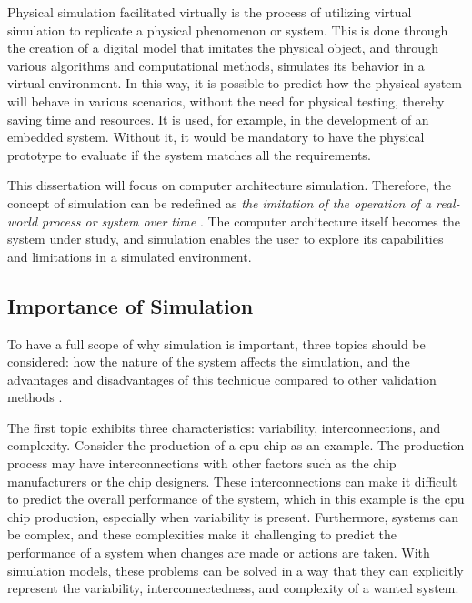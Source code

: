 Physical simulation facilitated virtually is the process of utilizing virtual simulation to replicate a physical phenomenon or system. This 
is done through the creation of a digital model that imitates the physical object, and through various algorithms and computational methods, 
simulates its behavior in a virtual environment. In this way, it is possible to predict how the physical system will behave in various scenarios, 
without the need for physical testing, thereby saving time and resources. It is used, for example, in the development of an embedded system. 
Without it, it would be mandatory to have the physical prototype to evaluate if the system matches all the requirements. 

This dissertation will focus on computer architecture simulation. Therefore, the concept of simulation can be redefined as \emph{the imitation 
of the operation of a real-world process or system over time} \cite{banks1999introduction}. The computer architecture itself becomes the system 
under study, and simulation enables the user to explore its capabilities and limitations in a simulated environment.

\subsection{Importance of Simulation}

To have a full scope of why simulation is important, three topics should be considered: how the nature of the system affects the simulation, and 
the advantages and disadvantages of this technique compared to other validation methods \cite{SimulationBook}.

The first topic exhibits three characteristics: variability, interconnections, and complexity. Consider the production of a \gls{cpu} chip as an 
example. The production process may have interconnections with other factors such as the chip manufacturers or the chip designers. These 
interconnections can make it difficult to predict the overall performance of the system, which in this example is the \gls{cpu} chip production, 
especially when variability is present. Furthermore, systems can be complex, and these complexities make it challenging to predict the performance 
of a system when changes are made or actions are taken. With simulation models, these problems can be solved in a way that they can explicitly 
represent the variability, interconnectedness, and complexity of a wanted system.

